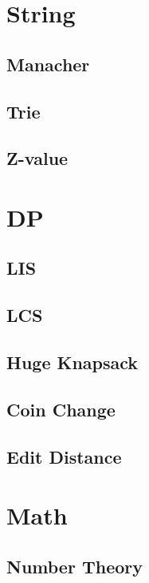 \section{String}
    \subsection{Manacher}
        
    \subsection{Trie}
        
    \subsection{Z-value}
        

\section{DP}
    \subsection{LIS}
        
    \subsection{LCS}
        
    \subsection{Huge Knapsack}
        
    \subsection{Coin Change}
        
    \subsection{Edit Distance}
        

\section{Math}
    \subsection{Number Theory}
        
